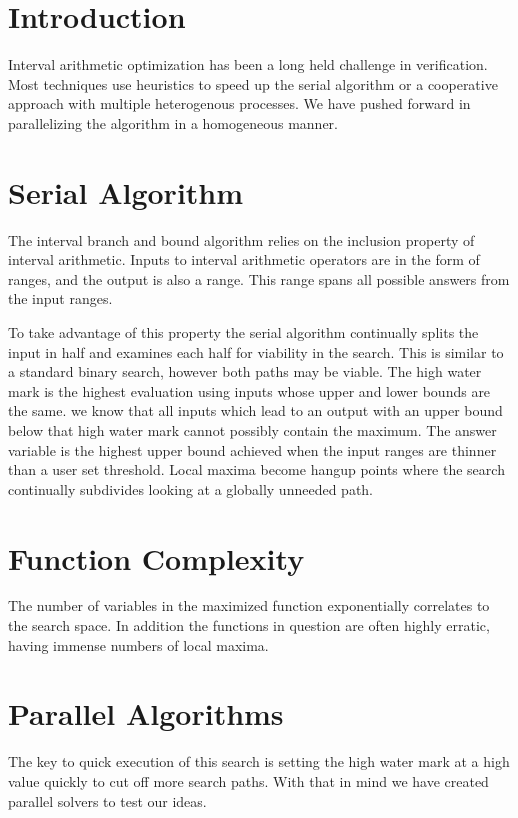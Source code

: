 \documentclass{acm_proc_article-sp}
\begin{document}
\maketitle

\section{Introduction}
Interval arithmetic optimization has been a long held challenge in verification. Most techniques use heuristics to speed up the serial algorithm or a cooperative approach with multiple heterogenous processes\cite{alliot2012finding}. We have pushed forward in parallelizing the algorithm in a homogeneous manner.  

\section{Serial Algorithm}
The interval branch and bound algorithm relies on the inclusion property of interval arithmetic. Inputs to interval arithmetic operators are in the form of ranges, and the output is also a range. This range spans all possible answers from the input ranges.

To take advantage of this property the serial algorithm continually splits the input in half and examines each half for viability in the search. This is similar to a standard binary search, however both paths may be viable. The high water mark is the highest evaluation using inputs whose upper and lower bounds are the same. we know that all inputs which lead to an output with an upper bound below that high water mark cannot possibly contain the maximum. The answer variable is the highest upper bound achieved when the input ranges are thinner than a user set threshold. Local maxima become hangup points where the search continually subdivides looking at a globally unneeded path.

\section{Function Complexity}
The number of variables in the maximized function exponentially correlates to the search space. In addition the functions in question are often highly erratic, having immense numbers of local maxima.

\section{Parallel Algorithms}
The key to quick execution of this search is setting the high water mark at a high value quickly to cut off more search paths. With that in mind we have created parallel solvers to test our ideas.
\end{document}
